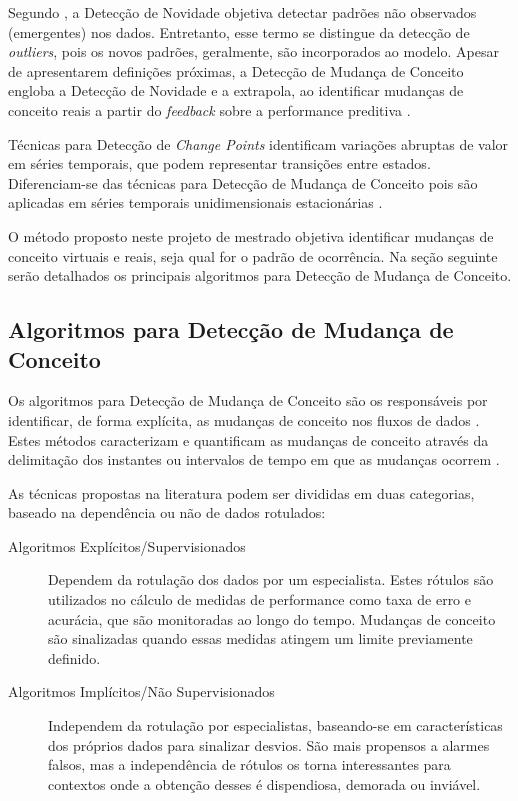 \documentclass[qual, classic, a4paper]{ufbathesis}
\begin{document}
Segundo \cite{Chandola:2009:ADS:1541880.1541882}, a Detecção de Novidade objetiva detectar padrões não observados (emergentes) nos dados.
Entretanto, esse termo se distingue da detecção de \textit{outliers}, pois os novos padrões, geralmente, são incorporados ao modelo.
Apesar de apresentarem definições próximas, a Detecção de Mudança de Conceito engloba a Detecção de Novidade e a extrapola, ao identificar 
mudanças de conceito reais a partir do \textit{feedback} sobre a performance preditiva \cite{Gama:2010:KDD:1855075}.

Técnicas para Detecção de \textit{Change Points} identificam variações abruptas de valor em séries temporais, que podem representar transições entre estados.
Diferenciam-se das técnicas para Detecção de Mudança de Conceito pois são aplicadas em séries temporais unidimensionais estacionárias \cite{Aminikhanghahi:2017:SMT:3086013.3086037}.

O método proposto neste projeto de mestrado objetiva identificar mudanças de conceito virtuais e reais, seja qual for o padrão de ocorrência.
Na seção seguinte serão detalhados os principais algoritmos para Detecção de Mudança de Conceito.

\subsection{Algoritmos para Detecção de Mudança de Conceito}

Os algoritmos para Detecção de Mudança de Conceito são os responsáveis por identificar, de forma explícita, as mudanças de conceito nos fluxos de dados \cite{Gama:2014:SCD:2597757.2523813}.
Estes métodos caracterizam e quantificam as mudanças de conceito através da delimitação dos instantes ou intervalos de tempo em que as mudanças ocorrem \cite{Basseville:1993:DAC:151741}.

As técnicas propostas na literatura podem ser divididas em duas categorias, baseado na dependência ou não de dados rotulados:
\begin{description}
    \item[Algoritmos Explícitos/Supervisionados] Dependem da rotulação dos dados por um especialista.
    Estes rótulos são utilizados no cálculo de medidas de performance como taxa de erro e acurácia, que são monitoradas ao longo do tempo.
    Mudanças de conceito são sinalizadas quando essas medidas atingem um limite previamente definido.

    \item[Algoritmos Implícitos/Não Supervisionados] Independem da rotulação por especialistas, 
    baseando-se em características dos próprios dados para sinalizar desvios.
    São mais propensos a alarmes falsos, mas a independência de rótulos os torna interessantes para contextos onde a obtenção desses é dispendiosa, demorada ou inviável.
\end{description}
\end{document}
